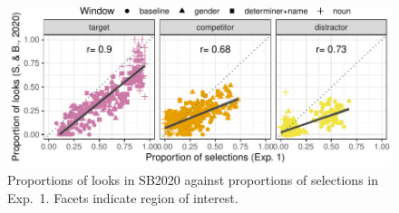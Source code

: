 \documentclass[10pt,letterpaper]{article}
\newcommand{\expref}[1]{Exp.~#1}
\newcommand{\jd}[1]{\textcolor{Red}{\textbf{[jd: #1]}}}
\begin{document}

\begin{figure}
\centering
\includegraphics[width=\columnwidth]{../../analysis/SunBreheny/1_incremental/main/graphs/corr-region}
\caption{Proportions of looks in SB2020 against proportions of selections in \expref{1}. Facets indicate region of interest.} 
\label{fig:corr-region}
\end{figure}
\end{document}
